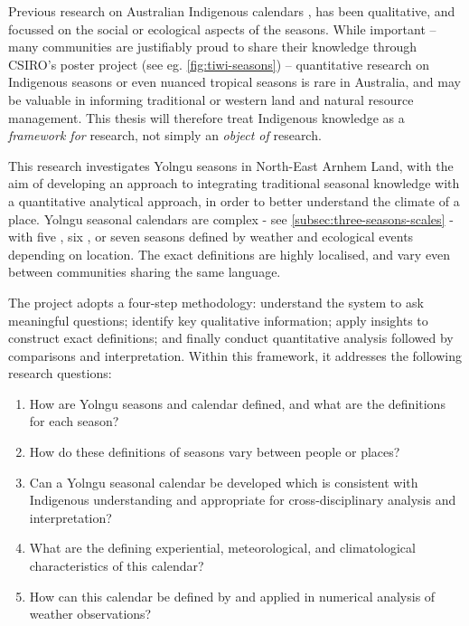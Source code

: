 
Previous research on Australian Indigenous calendars ,
\citep{CSIROcals,clarke2009,davis1989,atlas2014}
has been qualitative, and focussed on the social or ecological aspects of
the seasons.  While important -- many communities are justifiably proud to share
their knowledge through CSIRO's poster project (see eg. \cref{fig:tiwi-seasons})
-- quantitative research on Indigenous seasons or even nuanced tropical seasons
is rare in Australia, and may be valuable in informing traditional or western
land and natural resource management.  This thesis will therefore treat
Indigenous knowledge as a \emph{framework for} research, not simply an
\emph{object of} research.


This research investigates Yolngu seasons in North-East Arnhem Land, with the
aim of developing an approach to integrating traditional seasonal knowledge
with a quantitative analytical approach, in order to better understand the climate
of a place.  Yolngu seasonal calendars are complex - see
\cref{subsec:three-seasons-scales} - with five \citep{davis1989}, six
\citep{atlas2014}, or seven \citep{barber2005} seasons defined by weather and
ecological events depending on location.  The exact definitions are highly localised,
and vary even between communities sharing the same language.

The project adopts a four-step methodology:  understand the system to ask
meaningful questions; identify key qualitative information; apply insights to
construct exact definitions; and finally conduct quantitative analysis
followed by comparisons and interpretation.  Within this framework, it
addresses the following research questions:
\begin{enumerate}
\item How are Yolngu seasons and calendar defined, and what are the definitions for each season?
\item How do these definitions of seasons vary between people or places?
\item Can a Yolngu seasonal calendar be developed which is consistent with Indigenous
    understanding and appropriate for cross-disciplinary analysis and interpretation?
\item What are the defining experiential, meteorological, and climatological
    characteristics of this calendar?
\item How can this calendar be defined by and applied in numerical analysis of weather observations?
\end{enumerate}

